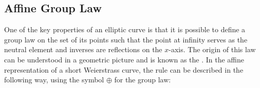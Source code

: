 \begin{comment}
Looking at the previous examples, the compression rate does not look very impressive. However, looking at the real-life example of the secp256k1 curve shows that compression is has significant practical advantages.
\begin{example}
Consider the secp256k1 curve from example \ref{secp256k1} again. The following code invokes Sage to generate a random affine curve point, then applies our compression method to it:
\begin{sagecommandline}
sage: P = secp256k1.random_point().xy()
sage: P
sage: # uncompressed affine point size
sage: ZZ(P[0]).nbits()+ZZ(P[1]).nbits()
sage: # compute the compression
sage: if P[1] > Fp(-1)/Fp(2):
....:     PARITY = 1
....: else:
....:     PARITY = 0
sage: PCOMPRESSED = [P[0],PARITY]
sage: PCOMPRESSED
sage: # compressed affine point size
sage: ZZ(PCOMPRESSED[0]).nbits()+ZZ(PCOMPRESSED[1]).nbits()
\end{sagecommandline}
\end{example}\sme{add explanation of how this shows what we claim}
\end{comment}

\subsection{Affine Group Law}
\label{sec:affine_group_law}
One of the key properties of an elliptic curve is that it is possible to define a group law on the set of its points such that the point at infinity serves as the neutral element and inverses are reflections on the $x$-axis. The origin of this law can be understood in a geometric picture and is known as the . In the affine representation of a short Weierstrass curve, the rule can be described in the following way, using the symbol $\oplus$ for the group law:

